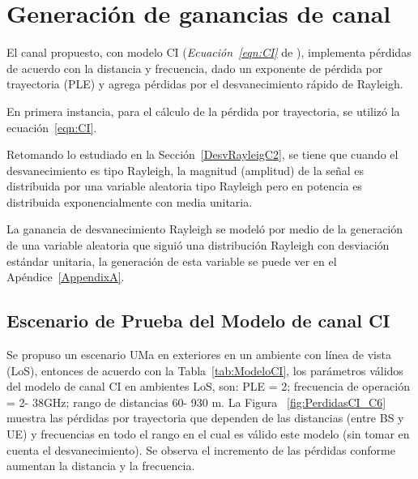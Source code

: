 \section{Generación de ganancias de canal}

El canal propuesto, con modelo CI (\textit{Ecuación~\ref{eqn:CI}} de \parencite{Sun2016}), implementa pérdidas de acuerdo con la distancia y frecuencia, dado un exponente de pérdida por trayectoria (PLE) y agrega pérdidas por el desvanecimiento rápido de Rayleigh.\newline

En primera instancia, para el cálculo de la pérdida por trayectoria, se utilizó la ecuación~\ref{eqn:CI}.

Retomando lo estudiado en la Sección~\ref{DesvRayleigC2}, se tiene que cuando el desvanecimiento es tipo Rayleigh, la magnitud (amplitud) de la señal es distribuida por una variable aleatoria tipo Rayleigh pero en potencia es distribuida exponencialmente con media unitaria. \newline

La ganancia de desvanecimiento Rayleigh se modeló por medio de la generación de una variable aleatoria que siguió una distribución Rayleigh con desviación estándar unitaria, la generación de esta variable se puede ver en el Apéndice~\ref{AppendixA}.

\subsection{Escenario de Prueba del Modelo de canal CI}

Se propuso un escenario UMa en exteriores en un ambiente con línea de vista (LoS), entonces de acuerdo con la Tabla~\ref{tab:ModeloCI}, los parámetros válidos del modelo de canal CI en ambientes LoS, son: PLE = 2; frecuencia de operación = 2- 38GHz; rango de distancias 60- 930 m. La Figura ~\ref{fig:PerdidasCI_C6} muestra las pérdidas por trayectoria que dependen de las distancias (entre BS y UE) y frecuencias en todo el rango en el cual es válido este modelo (sin tomar en cuenta el desvanecimiento). Se observa el incremento de las pérdidas conforme aumentan la distancia y la frecuencia. \newline

